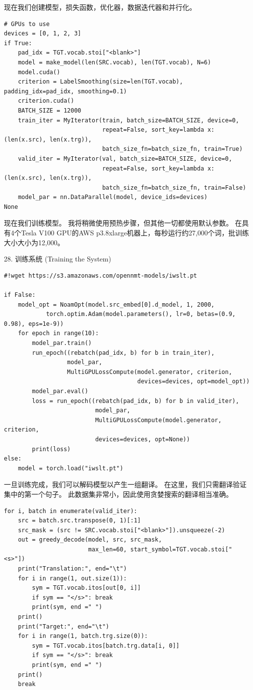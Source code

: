 现在我们创建模型，损失函数，优化器，数据迭代器和并行化。

\begin{Verbatim}
# GPUs to use
devices = [0, 1, 2, 3]
if True:
    pad_idx = TGT.vocab.stoi["<blank>"]
    model = make_model(len(SRC.vocab), len(TGT.vocab), N=6)
    model.cuda()
    criterion = LabelSmoothing(size=len(TGT.vocab), padding_idx=pad_idx, smoothing=0.1)
    criterion.cuda()
    BATCH_SIZE = 12000
    train_iter = MyIterator(train, batch_size=BATCH_SIZE, device=0,
                            repeat=False, sort_key=lambda x: (len(x.src), len(x.trg)),
                            batch_size_fn=batch_size_fn, train=True)
    valid_iter = MyIterator(val, batch_size=BATCH_SIZE, device=0,
                            repeat=False, sort_key=lambda x: (len(x.src), len(x.trg)),
                            batch_size_fn=batch_size_fn, train=False)
    model_par = nn.DataParallel(model, device_ids=devices)
None
\end{Verbatim}

现在我们训练模型。 我将稍微使用预热步骤，但其他一切都使用默认参数。 在具有4个Tesla V100 GPU的AWS p3.8xlarge机器上，每秒运行约27,000个词，批训练大小大小为12,000。

28. 训练系统 (Training the System)

\begin{Verbatim}
#!wget https://s3.amazonaws.com/opennmt-models/iwslt.pt

if False:
    model_opt = NoamOpt(model.src_embed[0].d_model, 1, 2000,
            torch.optim.Adam(model.parameters(), lr=0, betas=(0.9, 0.98), eps=1e-9))
    for epoch in range(10):
        model_par.train()
        run_epoch((rebatch(pad_idx, b) for b in train_iter), 
                  model_par, 
                  MultiGPULossCompute(model.generator, criterion, 
                                      devices=devices, opt=model_opt))
        model_par.eval()
        loss = run_epoch((rebatch(pad_idx, b) for b in valid_iter), 
                          model_par, 
                          MultiGPULossCompute(model.generator, criterion, 
                          devices=devices, opt=None))
        print(loss)
else:
    model = torch.load("iwslt.pt")
\end{Verbatim}

一旦训练完成，我们可以解码模型以产生一组翻译。 在这里，我们只需翻译验证集中的第一个句子。 此数据集非常小，因此使用贪婪搜索的翻译相当准确。

\begin{Verbatim}
for i, batch in enumerate(valid_iter):
    src = batch.src.transpose(0, 1)[:1]
    src_mask = (src != SRC.vocab.stoi["<blank>"]).unsqueeze(-2)
    out = greedy_decode(model, src, src_mask, 
                        max_len=60, start_symbol=TGT.vocab.stoi["<s>"])
    print("Translation:", end="\t")
    for i in range(1, out.size(1)):
        sym = TGT.vocab.itos[out[0, i]]
        if sym == "</s>": break
        print(sym, end =" ")
    print()
    print("Target:", end="\t")
    for i in range(1, batch.trg.size(0)):
        sym = TGT.vocab.itos[batch.trg.data[i, 0]]
        if sym == "</s>": break
        print(sym, end =" ")
    print()
    break
\end{Verbatim}

